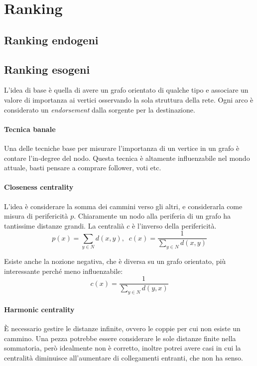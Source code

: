 \section{Ranking}

\subsection{Ranking endogeni}

\subsection{Ranking esogeni}

L'idea di base è quella di avere un grafo orientato di qualche tipo e associare 
un valore di importanza ai vertici osservando la sola struttura della rete.
Ogni arco è considerato un \emph{endorsement} dalla sorgente per la 
destinazione.

\paragraph{Tecnica banale}
Una delle tecniche base per misurare l'importanza di un vertice in un grafo 
è contare l'in-degree del nodo. Questa tecnica è altamente influenzabile nel 
mondo attuale, basti pensare a comprare follower, voti etc.

\paragraph{Closeness centrality}
L'idea è considerare la somma dei cammini verso gli altri, e considerarla 
come misura di perifericità $p$. Chiaramente un nodo alla periferia di un grafo 
ha tantissime distanze grandi. La centralià $c$ è l'inverso della perifericità.
$$p(x) = \sum_{y \in N} d(x, y),\;\;c(x) = \frac{1}{\sum_{y \in N} d(x, y)}$$

Esiste anche la nozione negativa, che è diversa su un grafo orientato, più
interessante perché meno influenzabile:
$$c(x) = \frac{1}{\sum_{y \in N} d(y, x)}$$

\paragraph{Harmonic centrality}
È necessario gestire le distanze infinite, ovvero le coppie per cui non 
esiste un cammino. Una pezza potrebbe essere considerare le sole distanze finite
nella sommatoria, però idealmente non è corretto, inoltre potrei avere casi in 
cui la centralità diminuisce all'aumentare di collegamenti entranti, che non ha 
senso.


